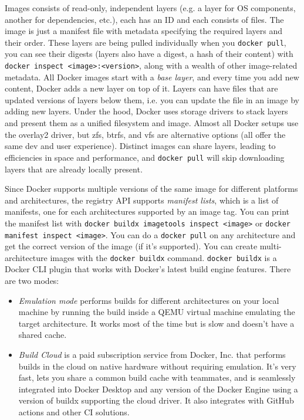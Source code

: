 \documentclass[8pt, table, xcdraw]{article}%
\begin{document}
Images consists of read-only, independent layers (e.g. a layer for OS components, another for dependencies, etc.), each has an ID and each consists of files. The image is just a manifest file with metadata specifying the required layers and their order. These layers are being pulled individually when you \lstinline{docker pull}, you can see their digests (layers also have a digest, a hash of their content) with \lstinline{docker inspect <image>:<version>}, along with a wealth of other image-related metadata. All Docker images start with a \emph{base layer}, and every time you add new content, Docker adds a new layer on top of it. Layers can have files that are updated versions of layers below them, i.e. you can update the file in an image by adding new layers. Under the hood, Docker uses storage drivers to stack layers and present them as a unified filesystem and image. Almost all Docker setups use the overlay2 driver, but zfs, btrfs, and vfs are alternative options (all offer the same dev and user experience). Distinct images can share layers, leading to efficiencies in space and performance, and \lstinline{docker pull} will skip downloading layers that are already locally present.

Since Docker supports multiple versions of the same image for different platforms and architectures, the registry API supports \emph{manifest lists}, which is a list of manifests, one for each architectures supported by an image tag. You can print the manifest list with \lstinline{docker buildx imagetools inspect <image>} or \lstinline{docker manifest inspect <image>}. You can do a \lstinline{docker pull} on any architecture and get the correct version of the image (if it's supported). You can create multi-architecture images with the \lstinline{docker buildx} command. \lstinline{docker buildx} is a Docker CLI plugin that works with Docker’s latest build engine features. There are two modes:

\begin{itemize}
    \item \emph{Emulation mode} performs builds for different architectures on your local machine by running the build inside a QEMU virtual machine emulating the target architecture. It works most of the time but is slow and doesn’t have a shared cache.
    \item \emph{Build Cloud} is a paid subscription service from Docker, Inc. that performs builds in the cloud on native hardware without requiring emulation. It’s very fast, lets you share a common build cache with teammates, and is seamlessly integrated into Docker Desktop and any version of the Docker Engine using a version of buildx supporting the cloud driver. It also integrates with GitHub actions and other CI solutions.
\end{itemize}
\end{document}
